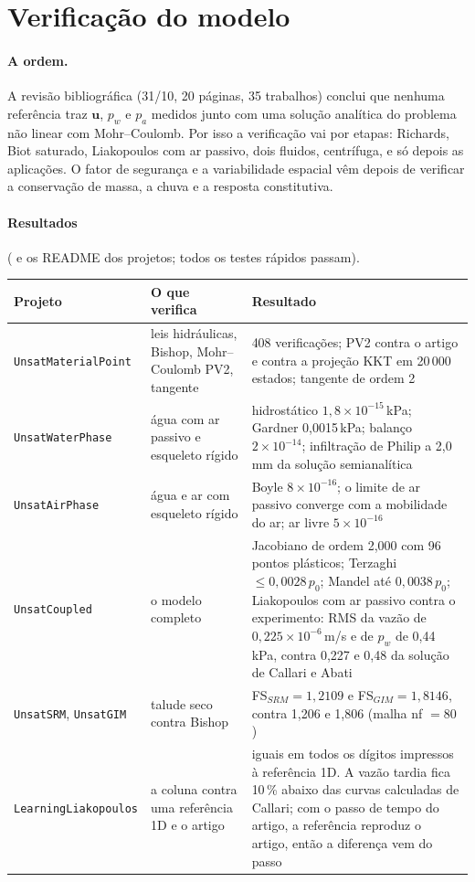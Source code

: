 \section{Verificação do modelo}
\label{sec:verificacao}

\paragraph{A ordem.} A revisão bibliográfica (31/10, 20 páginas, 35 trabalhos) conclui que nenhuma referência traz
$\bm u$, $p_w$ e $p_a$ medidos junto com uma solução analítica do problema não linear com Mohr--Coulomb. Por isso a
verificação vai por etapas: Richards, Biot saturado, Liakopoulos com ar passivo, dois fluidos, centrífuga, e só depois
as aplicações. O fator de segurança e a variabilidade espacial vêm depois de verificar a conservação de massa, a chuva
e a resposta constitutiva.

\paragraph{Resultados} ( e os README dos projetos; todos os testes rápidos passam).

\begin{center}\small
\begin{longtable}{@{}L{3.8cm} L{4.8cm} L{7.0cm}@{}}
\toprule
Projeto & O que verifica & Resultado \\
\midrule
\endhead
\texttt{UnsatMaterialPoint} & leis hidráulicas, Bishop, Mohr--Coulomb PV2, tangente &
  408 verificações; PV2 contra o artigo e contra a projeção KKT em 20\,000 estados; tangente de ordem 2 \\
\texttt{UnsatWaterPhase} & água com ar passivo e esqueleto rígido &
  hidrostático $1{,}8\times10^{-15}$\,kPa; Gardner 0,0015\,kPa; balanço $2\times10^{-14}$; infiltração de Philip a
  2,0\,mm da solução semianalítica \\
\texttt{UnsatAirPhase} & água e ar com esqueleto rígido &
  Boyle $8\times10^{-16}$; o limite de ar passivo converge com a mobilidade do ar; ar livre $5\times10^{-16}$ \\
\texttt{UnsatCoupled} & o modelo completo &
  Jacobiano de ordem 2,000 com 96 pontos plásticos; Terzaghi $\leq 0{,}0028\,p_0$; Mandel até $0{,}0038\,p_0$;
  Liakopoulos com ar passivo contra o experimento: RMS da vazão de $0{,}225\times10^{-6}$\,m/s e de $p_w$ de 0,44\,kPa,
  contra 0,227 e 0,48 da solução de Callari e Abati \\
\texttt{UnsatSRM}, \texttt{UnsatGIM} & talude seco contra Bishop &
  FS$_{SRM} = 1{,}2109$ e FS$_{GIM} = 1{,}8146$, contra 1,206 e 1,806 (malha nf $= 80$) \\
\texttt{LearningLiakopoulos} & a coluna contra uma referência 1D e o artigo &
  iguais em todos os dígitos impressos à referência 1D. A vazão tardia fica 10\,\% abaixo das curvas calculadas de
  Callari; com o passo de tempo do artigo, a referência reproduz o artigo, então a diferença vem do passo \\
\bottomrule
\end{longtable}
\end{center}

